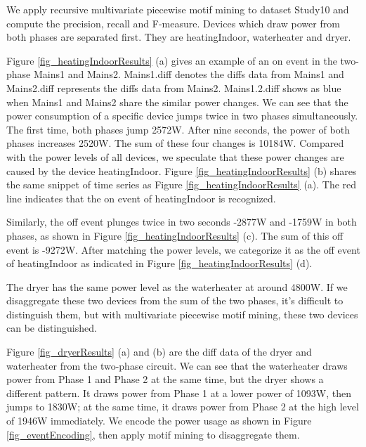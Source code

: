 We apply recursive multivariate piecewise motif mining to dataset Study10 
and compute the precision, recall and F-measure. 
Devices which draw power from both phases are separated first. 
They are heatingIndoor, waterheater and dryer.

Figure \ref{fig_heatingIndoorResults} (a) gives an example of 
an on event in the two-phase Mains1 and Mains2. 
Mains1.diff denotes the diffs data from Mains1 and Mains2.diff represents 
the diffs data from Mains2. 
Mains1.2.diff shows as blue when Mains1 and Mains2 share the similar power changes. 
We can see that 
the power consumption of a specific device jumps twice in two phases simultaneously.
The first time, both phases jump 2572W. After nine seconds, 
the power of both phases increases  2520W. 
The sum of these four changes is 10184W. 
Compared with the power levels of all devices, 
we speculate that these power changes are caused 
by the device heatingIndoor. 
Figure \ref{fig_heatingIndoorResults} (b) shares the same snippet of time series as Figure \ref{fig_heatingIndoorResults} (a). 
The red line indicates that the on event of heatingIndoor is recognized.    

Similarly, the off event plunges twice in two seconds -2877W and -1759W in both phases, as shown in Figure \ref{fig_heatingIndoorResults} (c).
The sum of this off event is -9272W. 
After matching the power levels, we categorize it as the off event of heatingIndoor as indicated in Figure \ref{fig_heatingIndoorResults} (d). 

The dryer has the same power level as the waterheater at around 4800W. 
If we disaggregate these two devices from the sum of the two phases, 
it's difficult to distinguish them,  
but with multivariate piecewise motif mining, these two devices 
can be distinguished. 

Figure \ref{fig_dryerResults} (a) and (b) are the diff data of the dryer and waterheater from the two-phase circuit. 
We can see that the waterheater draws power from Phase 1 and Phase 2 at the same time,  
but the dryer shows a different pattern. It draws power from Phase 1 at a lower power of 1093W, then jumps to 1830W; 
at the same time, it draws power from Phase 2 at the high level of 1946W immediately. 
We encode the power usage as shown in Figure \ref{fig_eventEncoding}, then apply motif mining to disaggregate them. 
 
